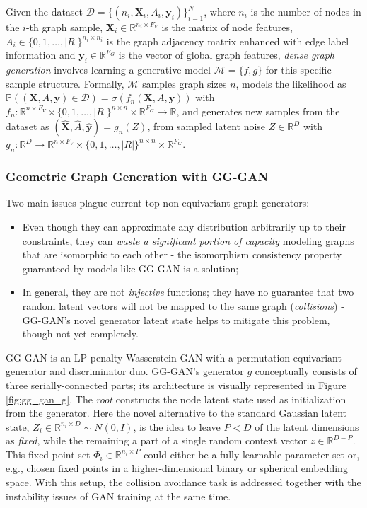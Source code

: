 \begin{definition}
Given the dataset $\mathcal{D}=\{(n_i,\mathbf{X}_i,A_i,\mathbf{y}_i)\}_{i=1}^{N}$, where $n_i$ is the number of nodes in the $i$-th graph sample, $\mathbf{X}_i \in \mathbb{R}^{n_i \times F_V}$ is the matrix of node features, $A_i \in \{0,1,\dots,|R|\}^{n_i \times n_i}$ is the graph adjacency matrix enhanced with edge label information and $\mathbf{y}_i \in \mathbb{R}^{F_G}$ is the vector of global graph features, \emph{dense graph generation} involves learning a generative model $\mathcal{M}=\{f,g\}$ for this specific sample structure. Formally, $\mathcal{M}$ samples graph sizes $n$, models the likelihood as $\mathbb{P}((\mathbf{X},A,\mathbf{y}) \in \mathcal{D})=\sigma(f_n(\mathbf{X},A,\mathbf{y}))$ with $f_n: \mathbb{R}^{n \times F_V} \times \{0,1,\dots,|R|\}^{n \times n} \times \mathbb{R}^{F_G} \to \mathbb{R}$, and generates new samples from the dataset as $(\hat{\mathbf{X}},\hat{A},\hat{\mathbf{y}})=g_n(Z)$, from sampled latent noise $Z\in\mathbb{R}^D$ with $g_n:\mathbb{R}^D \to \mathbb{R}^{n \times F_V} \times \{0,1,\dots,|R|\}^{n \times n} \times \mathbb{R}^{F_G}$.
\end{definition}

\subsubsection{Geometric Graph Generation with GG-GAN}
Two main issues plague current top non-equivariant graph generators: 
\begin{itemize}
\item Even though they can approximate any distribution arbitrarily up to their constraints, they can \emph{waste a significant portion of capacity} modeling graphs that are isomorphic to each other - the isomorphism consistency property guaranteed by models like GG-GAN is a solution;
\item In general, they are not \emph{injective} functions; they have no guarantee that two random latent vectors will not be mapped to the same graph (\emph{collisions}) - GG-GAN's novel generator latent state helps to mitigate this problem, though not yet completely.  
\end{itemize}

GG-GAN \cite{krawczuk_gg-gan_2020} is an LP-penalty Wasserstein GAN \cite{gulrajani_improved_2017} with a permutation-equivariant generator and discriminator duo. GG-GAN's generator $g$ conceptually consists of three serially-connected parts; its architecture is visually represented in Figure \ref{fig:gg_gan_g}. The \emph{root} constructs the node latent state used as initialization from the generator. Here the novel alternative to the standard Gaussian latent state, $Z_i \in \mathbb{R}^{n_i \times D} \sim N(0,I)$, is the idea to leave $P<D$ of the latent dimensions as \emph{fixed}, while the remaining a part of a single random context vector $z \in \mathbb{R}^{D-P}$. This fixed point set $\Phi_i \in \mathbb{R}^{n_i \times P}$ could either be a fully-learnable parameter set or, e.g., chosen fixed points in a higher-dimensional binary or spherical embedding space. With this setup, the collision avoidance task is addressed together with the instability issues of GAN training at the same time. 

